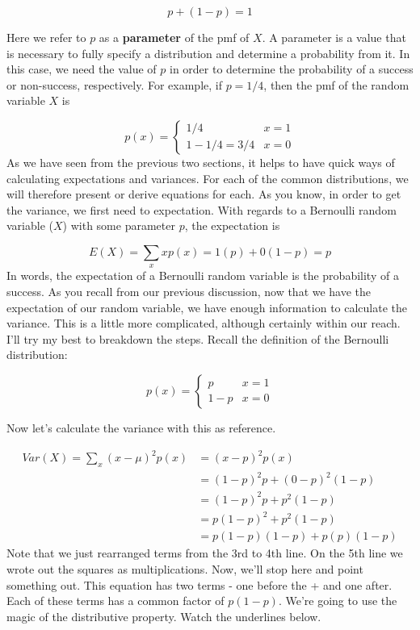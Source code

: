 \documentclass[
]{book}
\theoremstyle{definition}
\theoremstyle{definition}
\theoremstyle{definition}
\theoremstyle{definition}
\theoremstyle{remark}
\begin{document}
\[
p + (1-p) = 1
\]

Here we refer to \(p\) as a \textbf{parameter} of the pmf of \(X\). A parameter is a value that is necessary to fully specify a distribution and determine a probability from it. In this case, we need the value of \(p\) in order to determine the probability of a success or non-success, respectively. For example, if \(p = 1/4\), then the pmf of the random variable \(X\) is

\[
p(x) = 
\begin{cases}
1/4 & x = 1 \\
1-1/4 = 3/4 & x = 0 
\end{cases}
\]
As we have seen from the previous two sections, it helps to have quick ways of calculating expectations and variances. For each of the common distributions, we will therefore present or derive equations for each. As you know, in order to get the variance, we first need to expectation. With regards to a Bernoulli random variable (\(X\)) with some parameter \(p\), the expectation is

\[
E(X) = \sum_{x} xp(x) = 1(p) + 0(1-p) = p
\label{eq:bernexpectation}
\]
In words, the expectation of a Bernoulli random variable is the probability of a success. As you recall from our previous discussion, now that we have the expectation of our random variable, we have enough information to calculate the variance. This is a little more complicated, although certainly within our reach. I'll try my best to breakdown the steps. Recall the definition of the Bernoulli distribution:

\[
p(x) = 
\begin{cases}
p & x = 1 \\
1-p & x = 0 
\end{cases}
\]

Now let's calculate the variance with this as reference.

\begin{align}
Var(X) = \sum_{x} (x - \mu)^2p(x) &= (x-p)^2p(x) \\
&= (1-p)^2p + (0-p)^2(1-p) \\
&= (1-p)^2p + p^2(1-p) \\
&= p(1-p)^2 + p^2(1-p) \\
&= p(1-p)(1-p) + p(p)(1-p)
\end{align}
Note that we just rearranged terms from the 3rd to 4th line. On the 5th line we wrote out the squares as multiplications. Now, we'll stop here and point something out. This equation has two terms - one before the + and one after. Each of these terms has a common factor of \(p(1-p)\). We're going to use the magic of the distributive property. Watch the underlines below.
\end{document}
